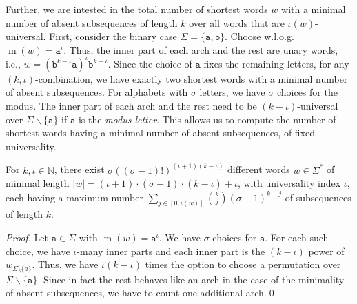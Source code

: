 \documentclass[runningheads,UKenglish,cleveref, autoref, thm-restate]{llncs}
\newcommand{\N}{\mathbb{N}}
\def\ta{\mathtt{a}}
\def\tb{\mathtt{b}}
\def\m{\operatorname{m}}
\DeclareMathOperator\ScatFact{SubSeq}
\newcommand{\todoah}[1]{\todo[color=violet,inline, textcolor = white]{#1}}
\newif\ifpaper
\begin{document}
Further, we are intested in the total number of shortest words $w$ with a minimal number of absent subsequences of length $k$ over all words that are $\iota(w)$-universal. First, consider the binary case $\Sigma=\{\ta,\tb\}$. Choose w.l.o.g. $\m(w)=\ta^{\iota}$. Thus, the inner part of each arch and the rest are unary words, i.e., $w=(\tb^{k-\iota}\ta)^{\iota}\tb^{k-\iota}$. Since the choice of $\ta$ fixes the remaining letters, for any $(k,\iota)$-combination, we have exactly two shortest words with a minimal number of absent subsequences. For alphabets with $\sigma$ letters, we have $\sigma$ choices for the modus. The inner part of each arch and the rest need to be $(k-\iota)$-universal over $\Sigma\backslash\{\ta\}$ if $\ta$ is the {\em modus-letter}. This allows us to compute the number of shortest words having a minimal number of absent subsequences, of fixed universality.

\begin{proposition}\label{prop:most-number-of-subseq}
For $k,\iota\in\N$, there
exist $\sigma((\sigma-1)!)^{(\iota+1)(k-\iota)}$ different words $w\in \Sigma^*$ of minimal length $ |w| = (\iota+1)\cdot(\sigma -1)\cdot(k-\iota) + \iota$, with universality index $\iota$, each having a maximum number $ \sum_{j \in [0, \iota(w)]} \binom{k}{j} (\sigma-1)^{k - j}$ of subsequences of length $k$. 
\end{proposition}
\ifpaper
\begin{proof}
	Let $\ta\in\Sigma$ with $\m(w)=\ta^{\iota}$. We have $\sigma$ choices for $\ta$. For each such choice,
	we have $\iota$-many inner parts and each inner part is the $(k-\iota)$ power of $w_{\Sigma\setminus\{a\}}$.
	Thus, we have $\iota(k-\iota)$ times the option to choose a permutation over $\Sigma\backslash\{\ta\}$. Since in fact the rest behaves like an arch in the case of the minimality of absent subsequences, we have to count one additional arch.\qed
\end{proof}
\else
\begin{proof}
	Let $\ta\in\Sigma$ with $\m(w)=\ta^{\iota}$. We have $\sigma$ choices for $\ta$. For each such choice,
	we have $\iota$-many inner parts and each inner part is the $(k-\iota)$ power of $w_{\Sigma\setminus\{a\}}$.
	Thus, we have $\iota(k-\iota)$ times the option to choose a permutation over $\Sigma\backslash\{\ta\}$. Since in fact the rest behaves like an arch in the case of the minimality of absent subsequences, we have to count one additional arch.\qed
\end{proof}
\fi
\end{document}

